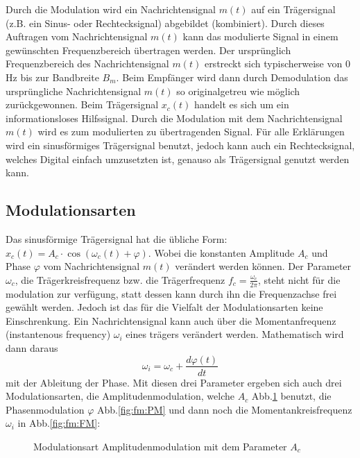%
%
%

Durch die Modulation wird ein Nachrichtensignal \(m(t)\) auf ein Trägersignal (z.B. ein Sinus- oder Rechtecksignal) abgebildet (kombiniert).
Durch dieses Auftragen vom Nachrichtensignal \(m(t)\) kann das modulierte Signal in einem gewünschten Frequenzbereich übertragen werden.
Der ursprünglich Frequenzbereich des Nachrichtensignal \(m(t)\) erstreckt sich typischerweise von 0 Hz bis zur Bandbreite \(B_m\).
Beim Empfänger wird dann durch Demodulation das ursprüngliche Nachrichtensignal \(m(t)\) so originalgetreu wie möglich zurückgewonnen.
Beim Trägersignal \(x_c(t)\) handelt es sich um ein informationsloses Hilfssignal.
Durch die Modulation mit dem Nachrichtensignal \(m(t)\) wird es zum modulierten zu übertragenden Signal.
Für alle Erklärungen wird ein sinusförmiges Trägersignal benutzt, jedoch kann auch ein Rechtecksignal,
welches Digital einfach umzusetzten ist, 
genauso als Trägersignal genutzt werden kann.\cite{fm:NAT}

\subsection{Modulationsarten\label{fm:section:modulation}}

Das sinusförmige Trägersignal hat die übliche Form: 
\(x_c(t) = A_c \cdot \cos(\omega_c(t)+\varphi)\).
Wobei die konstanten Amplitude \(A_c\) und Phase \(\varphi\) vom Nachrichtensignal \(m(t)\) verändert werden können.
Der Parameter \(\omega_c\), die Trägerkreisfrequenz bzw. die Trägerfrequenz \(f_c = \frac{\omega_c}{2\pi}\),
steht nicht für die modulation zur verfügung, statt dessen kann durch ihn die Frequenzachse frei gewählt werden.
\newblockpunct
Jedoch ist das für die Vielfalt der Modulationsarten keine Einschrenkung.
Ein Nachrichtensignal kann auch über die Momentanfrequenz (instantenous frequency) \(\omega_i\) eines trägers verändert werden.
Mathematisch wird dann daraus
\[
    \omega_i = \omega_c + \frac{d \varphi(t)}{dt}
\]
mit der Ableitung der Phase\cite{fm:NAT}.
Mit diesen drei Parameter ergeben sich auch drei Modulationsarten, die Amplitudenmodulation, welche \(A_c\) Abb.\ref{fig:fm:AM} benutzt, 
die Phasenmodulation \(\varphi\) Abb.\ref{fig:fm:PM} und dann noch die Momentankreisfrequenz \(\omega_i\) in Abb.\ref{fig:fm:FM}: 
\begin{figure} [h]%
    \centering
	
	\caption{Modulationsart Amplitudenmodulation mit dem Parameter \(A_c\)}
	\label{fig:fm:AM}

\end{figure}

